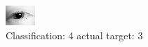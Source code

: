 \begin{figure}[h!]
\begin{center}
\includegraphics[width=0.60\columnwidth]{figures/ID0_class_4_target_3.png}
\end{center}
\caption{ Classification: 4 actual target: 3}
\label{fig:ID0_class_4_target_3}
\end{figure}
